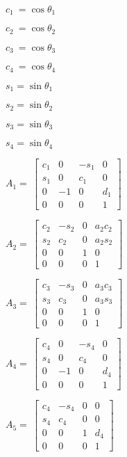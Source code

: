 \documentclass{article}
\begin{document}
$c_{1}\ =\allowbreak \cos \theta _{1}$

$c_{2}\ =\allowbreak \cos \theta _{2}$

$c_{3}\ =\allowbreak \cos \theta _{3}$

$c_{4}\ =\allowbreak \cos \theta _{4}$

\bigskip 

$s_{1}=\allowbreak \sin \theta _{1}$

$s_{2}=\allowbreak \sin \theta _{2}$

$s_{3}=\allowbreak \sin \theta _{3}$

$s_{4}=\allowbreak \sin \theta _{4}$

\bigskip 

$A_{1}=\ \left[ 
\begin{array}{cccc}
c_{1} & 0 & -s_{1} & 0 \\ 
s_{1} & 0 & c_{1} & 0 \\ 
0 & -1 & 0 & d_{1} \\ 
0 & 0 & 0 & 1%
\end{array}%
\right] $

\bigskip 

$A_{2}=\ \left[ 
\begin{array}{cccc}
c_{2} & -s_{2} & 0 & a_{2}c_{2} \\ 
s_{2} & c_{2} & 0 & a_{2}s_{2} \\ 
0 & 0 & 1 & 0 \\ 
0 & 0 & 0 & 1%
\end{array}%
\right] $

\bigskip 

$A_{3}=\ \left[ 
\begin{array}{cccc}
c_{3} & -s_{3} & 0 & a_{3}c_{3} \\ 
s_{3} & c_{3} & 0 & a_{3}s_{3} \\ 
0 & 0 & 1 & 0 \\ 
0 & 0 & 0 & 1%
\end{array}%
\right] $

$A_{4}=\ \left[ 
\begin{array}{cccc}
c_{4} & 0 & -s_{4} & 0 \\ 
s_{4} & 0 & c_{4} & 0 \\ 
0 & -1 & 0 & d_{4} \\ 
0 & 0 & 0 & 1%
\end{array}%
\right] $

\bigskip 

$A_{5}=\ \left[ 
\begin{array}{cccc}
c_{4} & -s_{4} & 0 & 0 \\ 
s_{4} & c_{4} & 0 & 0 \\ 
0 & 0 & 1 & d_{4} \\ 
0 & 0 & 0 & 1%
\end{array}%
\right] $
\end{document}
